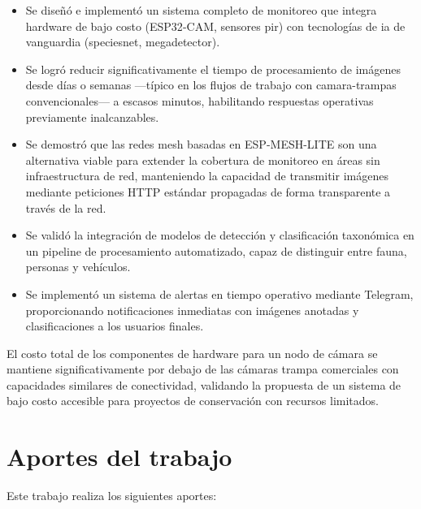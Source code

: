 \documentclass[a4paper, 12pt]{report}
\begin{document}
\begin{itemize}
  \item Se diseñó e implementó un sistema completo de monitoreo que
    integra hardware de bajo costo (\gls{ESP32}-CAM, sensores \gls{pir}) con
    tecnologías de \gls{ia} de vanguardia (\gls{speciesnet},
    \gls{megadetector}).

  \item Se logró reducir significativamente el tiempo de procesamiento
    de imágenes desde días o semanas ---típico en los flujos de trabajo
    con \glspl{camara-trampa} convencionales--- a escasos minutos,
    habilitando respuestas operativas previamente inalcanzables.

  \item Se demostró que las redes \gls{mesh} basadas en \gls{ESP-MESH-LITE}
    son una alternativa viable para extender la cobertura de monitoreo
    en áreas sin infraestructura de red, manteniendo la capacidad de
    transmitir imágenes mediante peticiones HTTP estándar propagadas
    de forma transparente a través de la red.

  \item Se validó la integración de modelos de detección y clasificación
    taxonómica en un pipeline de procesamiento automatizado, capaz de
    distinguir entre fauna, personas y vehículos.

  \item Se implementó un sistema de alertas en tiempo operativo mediante
    Telegram, proporcionando notificaciones inmediatas con imágenes
    anotadas y clasificaciones a los usuarios finales.
\end{itemize}

El costo total de los componentes de hardware para un nodo de cámara se
mantiene significativamente por debajo de las cámaras trampa comerciales
con capacidades similares de conectividad, validando la propuesta de un
sistema de bajo costo accesible para proyectos de conservación con
recursos limitados.

\section{Aportes del trabajo}

Este trabajo realiza los siguientes aportes:
\end{document}
